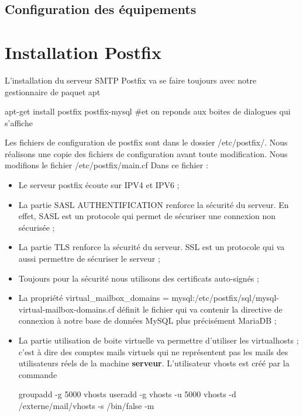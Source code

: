 \documentclass[a4paper,12pt,french]{report} %
\begin{document}
\subsection{Configuration des équipements}

\section{Installation Postfix}
L'installation du serveur SMTP Postfix va se faire toujours avec notre gestionnaire de paquet apt
\begin{exempleConsole}
apt-get install postfix  postfix-mysql #et on reponds aux boites de dialogues qui s'affiche
\end{exempleConsole}

Les fichiers de configuration de postfix sont dans le dossier /etc/postfix/.
Nous réalisons une copie des fichiers de configuration avant toute modification.
Nous modifions le fichier /etc/postfix/main.cf
\fussy
{}
\nocesure
Dans ce fichier :
\begin{itemize}
	\item Le serveur postfix écoute sur IPV4 et IPV6 ;
	\item La partie SASL AUTHENTIFICATION renforce la sécurité du serveur. En effet, SASL est un protocole qui permet de sécuriser une connexion non sécurisée ;
	\item La partie TLS renforce la sécurité du serveur. SSL est un protocole qui va aussi permettre de sécuriser le serveur ;
	\item Toujours pour la sécurité nous utilisons des certificats auto-signés ; 
	\item La propriété virtual\_mailbox\_domains = mysql:/etc/postfix/sql/mysql-virtual-mailbox-domains.cf définit le fichier qui va contenir la directive de connexion à notre base de données MySQL plus précisément MariaDB ;
	\item La partie utilisation de boite virtuelle va permettre d'utiliser les virtualhosts ; c'est à dire des comptes mails virtuels qui ne représentent pas les mails des utilisateurs réels de la machine \textbf{serveur}. L'utilisateur vhosts est créé par la commande
	\begin{exempleConsole}
	groupadd -g 5000 vhosts 
	useradd -g vhosts -u 5000 vhosts -d /externe/mail/vhosts -s /bin/false -m
	\end{exempleConsole}
\end{itemize}
\end{document}
